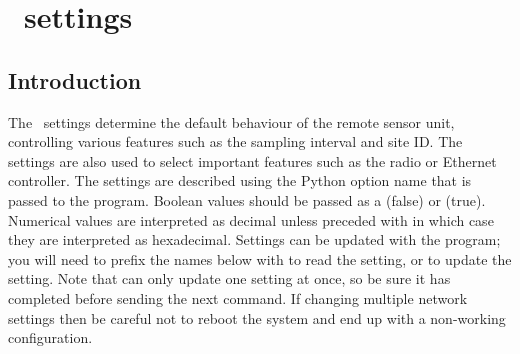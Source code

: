 \chapter[EEPROM settings]{\eeprom\ settings}
\label{chapter:eeeprom-settings}

\newcommand{\optionexample}[1]{\examplebox{\code{#1}}}

\section{Introduction}
The \eeprom\ settings determine the default behaviour of the remote
sensor unit, controlling various features such as the sampling
interval and site ID. The settings are also used to select important
features such as the radio or Ethernet controller. The settings are
described using the Python option name that is passed to the
 program. Boolean values should
be passed as a  (false) or  (true). Numerical values
are interpreted as decimal unless preceded with  in which
case they are interpreted as hexadecimal. Settings can be updated with
the  program; you will need to prefix the names
below with  to read the setting, or
 to update the setting. Note that 
can only update one setting at once, so be sure it has completed
before sending the next command. If changing multiple network settings
then be careful not to reboot the system and end up with a non-working
configuration.



